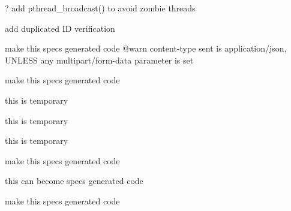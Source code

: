 
\begin{DoxyRefList}
\item[Member \mbox{\hyperlink{discord-internal_8h_a82c20ff44bc4a01a9f6a77b0aef49426}{discord\+\_\+bucket\+\_\+try\+\_\+cooldown}} (struct \mbox{\hyperlink{structdiscord__bucket}{discord\+\_\+bucket}} $\ast$bucket)]\label{todo__todo000016}%
%
? add pthread\+\_\+broadcast() to avoid zombie threads  
\item[Member \mbox{\hyperlink{discord_8h_aacda48df5d68ed8d5cf6983f245f3224}{discord\+\_\+bulk\+\_\+delete\+\_\+messages}} (struct discord $\ast$client, u64\+\_\+snowflake\+\_\+t channel\+\_\+id, N\+T\+L\+\_\+\+T(u64\+\_\+snowflake\+\_\+t) messages)]\label{todo__todo000001}%
%
add duplicated ID verification  
\item[Class \mbox{\hyperlink{structdiscord__create__message__params}{discord\+\_\+create\+\_\+message\+\_\+params}} ]\label{todo__todo000021}%
%
make this specs generated code @warn content-\/type sent is {\ttfamily application/json}, U\+N\+L\+E\+SS any {\ttfamily multipart/form-\/data} parameter is set  
\item[Class \mbox{\hyperlink{structdiscord__edit__message__params}{discord\+\_\+edit\+\_\+message\+\_\+params}} ]\label{todo__todo000022}%
%
make this specs generated code  
\item[Member \mbox{\hyperlink{structdiscord__gateway_a3595a1cbbd88f6a10d736d2f28e8ca3e}{discord\+\_\+gateway::sb\+\_\+bot}} ]\label{todo__todo000013}%
%
this is temporary  
\item[Member \mbox{\hyperlink{structdiscord__gateway_af747d62ba16af1be83cd9d60f1171f00}{discord\+\_\+gateway::sb\+\_\+on\+\_\+message\+\_\+create}} ]\label{todo__todo000014}%
%
this is temporary  
\item[Member \mbox{\hyperlink{structdiscord__gateway_a32ad1c84342e9c685bcfdf8ad5fc5f3e}{discord\+\_\+gateway::sb\+\_\+on\+\_\+message\+\_\+update}} ]\label{todo__todo000015}%
%
this is temporary  
\item[Class \mbox{\hyperlink{structdiscord__get__channel__messages__params}{discord\+\_\+get\+\_\+channel\+\_\+messages\+\_\+params}} ]\label{todo__todo000020}%
%
make this specs generated code  
\item[Class \mbox{\hyperlink{structdiscord__list__guild__members__params}{discord\+\_\+list\+\_\+guild\+\_\+members\+\_\+params}} ]\label{todo__todo000023}%
%
this can become specs generated code  
\item[Class \mbox{\hyperlink{structdiscord__session}{discord\+\_\+session}} ]\label{todo__todo000019}%
%
make this specs generated code 
\end{DoxyRefList}